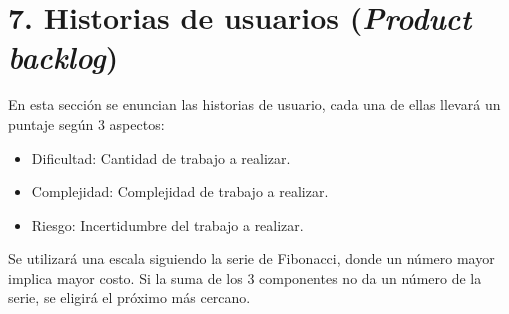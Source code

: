 \documentclass[
11pt, %
]{charter}
\begin{document}
\section{7. Historias de usuarios (\textit{Product backlog})}
\label{sec:backlog}

En esta sección se enuncian las historias de usuario, cada una de ellas llevará un puntaje según 3 aspectos:
\begin{itemize}
	\item Dificultad: Cantidad de trabajo a realizar.
	\item Complejidad: Complejidad de trabajo a realizar.
	\item Riesgo: Incertidumbre del trabajo a realizar.
\end{itemize}
Se utilizará una escala siguiendo la serie de Fibonacci, donde un número mayor implica mayor costo. Si la suma de los 3 componentes no da un número de la serie, se eligirá el próximo más cercano.
\end{document}
